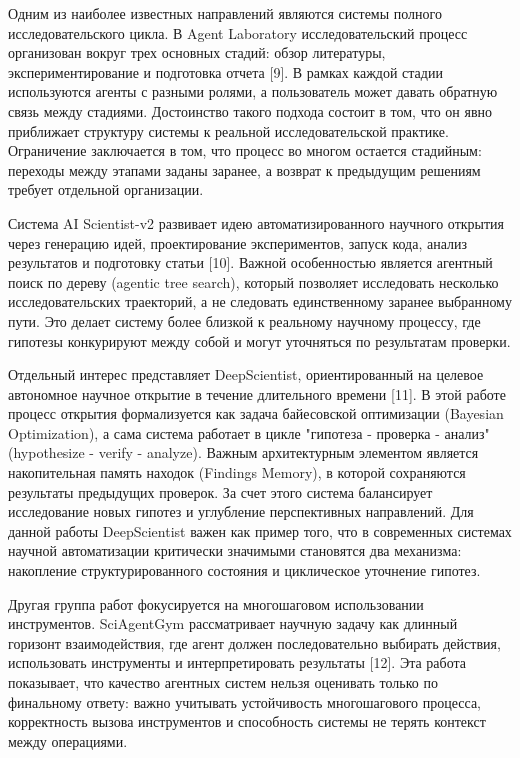 Одним из наиболее известных направлений являются системы полного исследовательского цикла. В Agent Laboratory исследовательский процесс организован вокруг трех основных стадий: обзор литературы, экспериментирование и подготовка отчета [9]. В рамках каждой стадии используются агенты с разными ролями, а пользователь может давать обратную связь между стадиями. Достоинство такого подхода состоит в том, что он явно приближает структуру системы к реальной исследовательской практике. Ограничение заключается в том, что процесс во многом остается стадийным: переходы между этапами заданы заранее, а возврат к предыдущим решениям требует отдельной организации.

Система AI Scientist-v2 развивает идею автоматизированного научного открытия через генерацию идей, проектирование экспериментов, запуск кода, анализ результатов и подготовку статьи [10]. Важной особенностью является агентный поиск по дереву (agentic tree search), который позволяет исследовать несколько исследовательских траекторий, а не следовать единственному заранее выбранному пути. Это делает систему более близкой к реальному научному процессу, где гипотезы конкурируют между собой и могут уточняться по результатам проверки.

Отдельный интерес представляет DeepScientist, ориентированный на целевое автономное научное открытие в течение длительного времени [11]. В этой работе процесс открытия формализуется как задача байесовской оптимизации (Bayesian Optimization), а сама система работает в цикле "гипотеза - проверка - анализ" (hypothesize - verify - analyze). Важным архитектурным элементом является накопительная память находок (Findings Memory), в которой сохраняются результаты предыдущих проверок. За счет этого система балансирует исследование новых гипотез и углубление перспективных направлений. Для данной работы DeepScientist важен как пример того, что в современных системах научной автоматизации критически значимыми становятся два механизма: накопление структурированного состояния и циклическое уточнение гипотез.

Другая группа работ фокусируется на многошаговом использовании инструментов. SciAgentGym рассматривает научную задачу как длинный горизонт взаимодействия, где агент должен последовательно выбирать действия, использовать инструменты и интерпретировать результаты [12]. Эта работа показывает, что качество агентных систем нельзя оценивать только по финальному ответу: важно учитывать устойчивость многошагового процесса, корректность вызова инструментов и способность системы не терять контекст между операциями.

